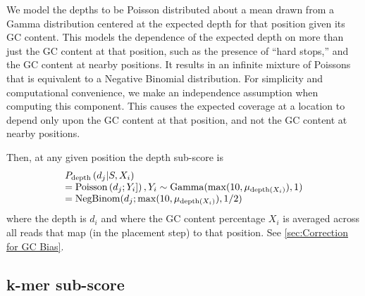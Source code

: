 \documentclass[phd,tocprelim]{cornell}
\begin{document}
We model the depths to be Poisson distributed about a mean drawn from a Gamma distribution centered at the expected depth for that position given its GC content. This models the dependence of the expected depth on more than just the GC content at that position, such as the presence of “hard stops,” and the GC content at nearby positions. It results in an infinite mixture of Poissons that is equivalent to a Negative Binomial distribution. For simplicity and computational convenience, we make an independence assumption when computing this component.  This causes the expected coverage at a location to depend only upon the GC content at that position, and not the GC content at nearby positions.

Then, at any given position the depth sub-score is
\begin{equation}
    \begin{array}{l}
        P_{\text{depth}}\left(d_{j}|S,X_{i}\right) \\
        = {\rm Poisson}\left(d_{j};Y_{i}]\right), Y_{i} \sim {\rm Gamma}(\max(10,\mu_{\text{depth}(X_{i})}), 1) \\
        = {\rm NegBinom}(d_{j}; \max(10, \mu_{\text{depth}(X_{i})}), 1/2)
    \end{array}
\end{equation}
where the depth is $d_{i}$ and where the GC content percentage $X_{i}$ is averaged across all reads that map (in the placement step) to that position. See \ref{sec:Correction for GC Bias}.


\subsection{k-mer sub-score} %
\label{sub:k-mer sub-score}
\end{document}
